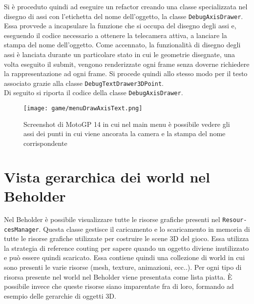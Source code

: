 Si è proceduto quindi ad eseguire un refactor creando una classe specializzata nel disegno di assi con l'etichetta del nome dell'oggetto, la classe \texttt{DebugAxisDrawer}.\\

Essa provvede a incapsulare la funzione che si occupa del disegno degli assi e, eseguendo il codice necessario a ottenere la telecamera attiva, a lanciare la stampa del nome dell'oggetto. Come accennato, la funzionalità di disegno degli assi è lanciata durante un particolare stato in cui le geometrie disegnate, una volta eseguito il submit, vengono renderizzate ogni frame senza doverne richiedere la rappresentazione ad ogni frame. Si procede quindi allo stesso modo per il testo associato grazie alla classe \texttt{DebugTextDrawer3DPoint}.\\

Di seguito si riporta il codice della classe \texttt{DebugAxisDrawer}.





\begin{figure}[h!] 
	\centering 
	\hspace*{-0.05\columnwidth}\texttt{[image: game/menuDrawAxisText.png]} 
	\caption{Screenshot di MotoGP 14 in cui nel main menu è possibile vedere gli assi dei punti in cui viene ancorata la camera e la stampa del nome corrispondente}
\end{figure}

\section{Vista gerarchica dei world nel Beholder}
	Nel Beholder è possibile visualizzare tutte le risorse grafiche presenti nel \texttt{Resour-} \texttt{cesManager}. Questa classe gestisce il caricamento e lo scaricamento in memoria di tutte le risorse grafiche utilizzate per costruire le scene 3D del gioco. Essa utilizza la strategia di reference couting per sapere quando un oggetto diviene inutilizzato e può essere quindi scaricato. Essa contiene quindi una collezione di world in cui sono presenti le varie risorse (mesh, texture, animazioni, ecc..). Per ogni tipo di risorsa presente nel world nel Beholder viene presentata come lista piatta. È possibile invece che queste risorse siano imparentate fra di loro, formando ad esempio delle gerarchie di oggetti 3D.\\
	
